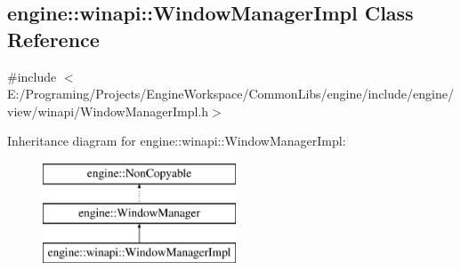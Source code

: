 \hypertarget{a00088}{}\subsection{engine\+:\+:winapi\+:\+:Window\+Manager\+Impl Class Reference}
\label{a00088}


{\ttfamily \#include $<$E\+:/\+Programing/\+Projects/\+Engine\+Workspace/\+Common\+Libs/engine/include/engine/view/winapi/\+Window\+Manager\+Impl.\+h$>$}

Inheritance diagram for engine\+:\+:winapi\+:\+:Window\+Manager\+Impl\+:\begin{figure}[H]
\begin{center}
\leavevmode
\includegraphics[height=3.000000cm]{a00088}
\end{center}
\end{figure}
